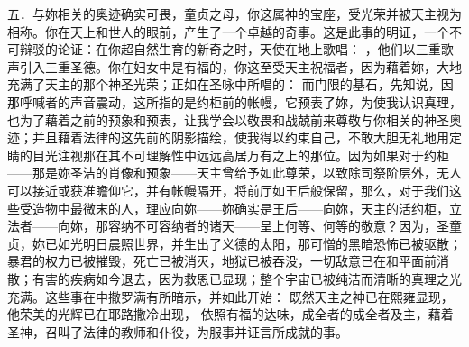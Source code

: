 五．与妳相关的奥迹确实可畏，童贞之母，你这属神的宝座，受光荣并被天主视为相称。你在天上和世人的眼前，产生了一个卓越的奇事。这是此事的明证，一个不可辩驳的论证：在你超自然生育的新奇之时，天使在地上歌唱： ，他们以三重歌声引入三重圣德。你在妇女中是有福的，你这至受天主祝福者，因为藉着妳，大地充满了天主的那个神圣光荣；正如在圣咏中所唱的： 而门限的基石，先知说，因那呼喊者的声音震动，这所指的是约柜前的帐幔，它预表了妳，为使我认识真理，也为了藉着之前的预象和预表，让我学会以敬畏和战兢前来尊敬与你相关的神圣奥迹；并且藉着法律的这先前的阴影描绘，使我得以约束自己，不敢大胆无礼地用定睛的目光注视那在其不可理解性中远远高居万有之上的那位。因为如果对于约柜——那是妳圣洁的肖像和预象——天主曾给予如此尊荣，以致除司祭阶层外，无人可以接近或获准瞻仰它，并有帐幔隔开，将前厅如王后般保留，那么，对于我们这些受造物中最微末的人，理应向妳——妳确实是王后——向妳，天主的活约柜，立法者——向妳，那容纳不可容纳者的诸天——呈上何等、何等的敬意？因为，圣童贞，妳已如光明日晨照世界，并生出了义德的太阳，那可憎的黑暗恐怖已被驱散；暴君的权力已被摧毁，死亡已被消灭，地狱已被吞没，一切敌意已在和平面前消散；有害的疾病如今退去，因为救恩已显现；整个宇宙已被纯洁而清晰的真理之光充满。这些事在中撒罗满有所暗示，并如此开始：  既然天主之神已在熙雍显现，他荣美的光辉已在耶路撒冷出现， 依照有福的达味，成全者的成全者及主，藉着圣神，召叫了法律的教师和仆役，为服事并证言所成就的事。\par

